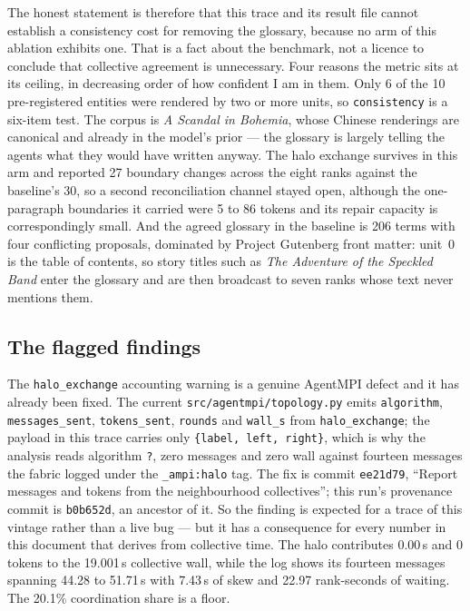 \documentclass[11pt]{article}
\begin{document}
The honest statement is therefore that this trace and its result file cannot establish a
consistency cost for removing the glossary, because no arm of this ablation exhibits one. That is
a fact about the benchmark, not a licence to conclude that collective agreement is unnecessary.
Four reasons the metric sits at its ceiling, in decreasing order of how confident I am in them.
Only 6 of the 10 pre-registered entities were rendered by two or more units, so
\texttt{consistency} is a six-item test. The corpus is \emph{A Scandal in Bohemia}, whose Chinese
renderings are canonical and already in the model's prior --- the glossary is largely telling the
agents what they would have written anyway. The halo exchange survives in this arm and reported
27 boundary changes across the eight ranks against the baseline's 30, so a second reconciliation
channel stayed open, although the one-paragraph boundaries it carried were 5 to 86 tokens and its
repair capacity is correspondingly small. And the agreed glossary in the baseline is 206 terms
with four conflicting proposals, dominated by Project Gutenberg front matter: unit~0 is the table
of contents, so story titles such as \emph{The Adventure of the Speckled Band} enter the glossary
and are then broadcast to seven ranks whose text never mentions them.

\subsection*{The flagged findings}

The \texttt{halo\_exchange} accounting warning is a genuine AgentMPI defect and it has already been
fixed. The current \texttt{src/agentmpi/topology.py} emits \texttt{algorithm},
\texttt{messages\_sent}, \texttt{tokens\_sent}, \texttt{rounds} and \texttt{wall\_s} from
\texttt{halo\_exchange}; the payload in this trace carries only \texttt{\{label, left, right\}},
which is why the analysis reads algorithm \texttt{?}, zero messages and zero wall against fourteen
messages the fabric logged under the \texttt{\_ampi:halo} tag. The fix is commit
\texttt{ee21d79}, ``Report messages and tokens from the neighbourhood collectives''; this run's
provenance commit is \texttt{b0b652d}, an ancestor of it. So the finding is expected for a trace of
this vintage rather than a live bug --- but it has a consequence for every number in this document
that derives from collective time. The halo contributes 0.00\,s and 0 tokens to the 19.001\,s
collective wall, while the log shows its fourteen messages spanning 44.28 to 51.71\,s with 7.43\,s
of skew and 22.97 rank-seconds of waiting. The 20.1\% coordination share is a floor.
\end{document}
